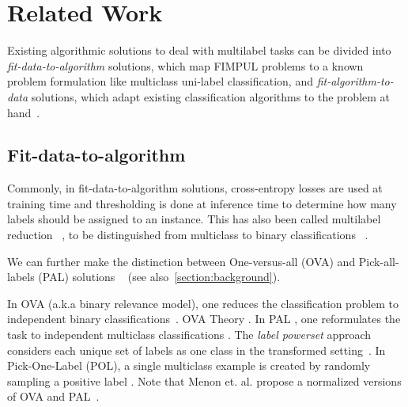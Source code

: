 
\section{Related Work}
\label{sec:org2aceb9f}


Existing algorithmic solutions to deal with multilabel tasks can be divided into \emph{fit-data-to-algorithm} solutions, which map FIMPUL problems to a known problem formulation like multiclass uni-label classification, and \emph{fit-algorithm-to-data} solutions, which adapt existing classification
algorithms to the problem at hand~\citep{multilabelMethods}.

\subsection{Fit-data-to-algorithm}
Commonly, in fit-data-to-algorithm solutions, cross-entropy losses are used at training time and thresholding is done at inference time to determine how many labels should be assigned to an instance. This has also been called multilabel reduction ~\citep{multilabelReduction}, to be distinguished from multiclass to binary classifications ~\citep{multiclassToBinary1, multiclassToBinary2, multiclassToBinary3}.

We can further make the distinction between One-versus-all (OVA) and Pick-all-labels (PAL) solutions ~\citep{multilabelReduction} (see also~\ref{section:background}).

In OVA (a.k.a binary relevance model), one reduces the classification problem to independent binary classifications~\citep{OVA1, hammingLoss, OVA2}. OVA Theory \cite{OVATheory}. In PAL , one reformulates the task to independent multiclass classifications \citep{labelPowerset, extremeClassification, PAL}. The \textit{label powerset} approach considers each unique set of labels as one class in the transformed setting~\cite{labelPowerset}. In Pick-One-Label (POL), a single multiclass example is created by randomly sampling a positive label \cite{PAL, extremeClassification}. Note that Menon et. al. propose a normalized versions of OVA and PAL~\cite{multilabelReduction}.

